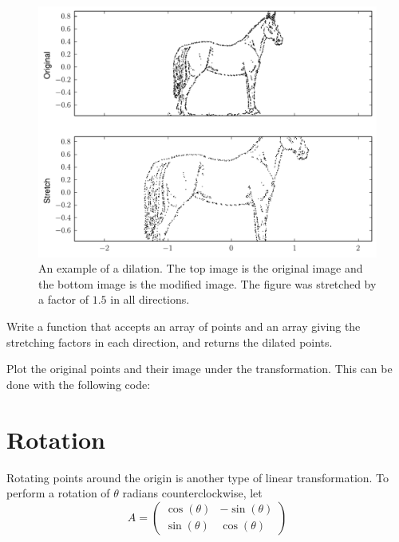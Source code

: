 \begin{figure}
\centering
\includegraphics[width=\textwidth]{stretch.pdf}
\caption{An example of a dilation. The top image is the original image and the bottom image is the modified image. The figure was stretched by a factor of $1.5$ in all directions.}
\end{figure}

\begin{problem}
Write a function that accepts an array of points and an array giving the stretching factors in each direction, and returns the dilated points. 

Plot the original points and their image under the transformation. This can be done with the following code:



\end{problem}

\section*{Rotation}
Rotating points around the origin is another type of linear transformation. To perform a rotation of $\theta$ radians counterclockwise, let
\[
A = \begin{pmatrix}
\cos(\theta) & -\sin(\theta) \\
\sin(\theta) & \cos(\theta)
\end{pmatrix}
\]

